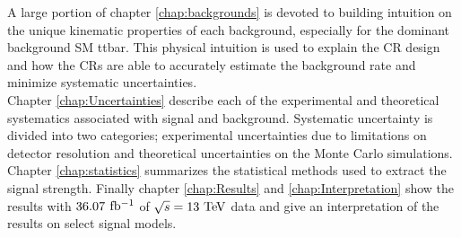 \indent  A large portion of chapter \ref{chap:backgrounds} is devoted to building intuition on the unique kinematic properties of each background, especially for the dominant background SM ttbar.  This physical intuition is used to explain the CR design and how the CRs are able to accurately estimate the background rate and minimize systematic uncertainties.  \\

\indent Chapter \ref{chap:Uncertainties} describe each of the experimental and theoretical systematics associated with signal and background.  Systematic uncertainty is divided into two categories; experimental uncertainties due to limitations on detector resolution and theoretical uncertainties on the Monte Carlo simulations. \\

\indent Chapter \ref{chap:statistics} summarizes the statistical methods used to extract the signal strength.  Finally chapter \ref{chap:Results} and \ref{chap:Interpretation} show the results with $36.07$ $\mbox{fb$^{-1}$}$ of $\sqrt{s} = 13 \tev$ data and give an interpretation of the results on select signal models.  \\



